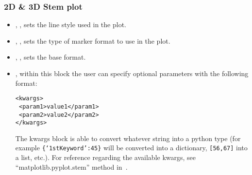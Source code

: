 \subsubsection{2D \& 3D Stem plot}
  \begin{itemize}
  \item {}, , sets the line
  style used in the plot.
  \item {}, , sets the type of
  marker format to use in the plot.
  \item {}, , sets the base
  format.
  \item {}, within this block the user can specify optional
  parameters with the following format:

\begin{lstlisting}[style=XML]
<kwargs>
 <param1>value1</param1>
 <param2>value2</param2>
</kwargs>
\end{lstlisting}

    The kwargs block is able to convert whatever string into a python type (for
    example \texttt{\{`1stKeyword':45\}} will
    be converted into a dictionary, 
    \texttt{[56,67]} into a list, etc.).
  For reference regarding the available kwargs, see ``matplotlib.pyplot.stem''
  method in~\cite{MatPlotLib}.
    \end{itemize}

